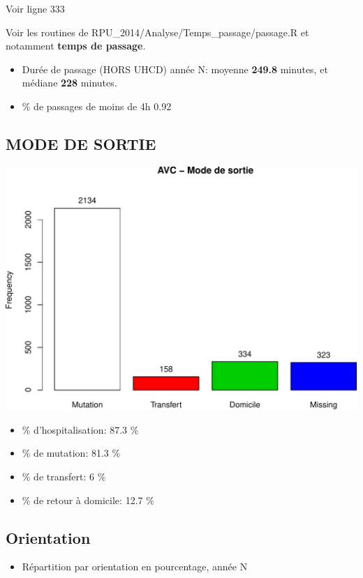 \documentclass[]{article}
\begin{document}
Voir ligne 333

Voir les routines de RPU\_2014/Analyse/Temps\_passage/passage.R et
notamment \textbf{temps de passage}.

\begin{itemize}
\itemsep1pt\parskip0pt
\item
  Durée de passage (HORS UHCD) année N: moyenne \textbf{249.8} minutes,
  et médiane \textbf{228} minutes.
\item
  \% de passages de moins de 4h 0.92
\end{itemize}

\subsection{MODE DE SORTIE}\label{mode-de-sortie-2}

\includegraphics{rapport2014_V4_files/figure-latex/avc_mode_sortie-1.pdf}

\begin{itemize}
\itemsep1pt\parskip0pt
\item
  \% d'hospitalisation: 87.3 \%
\item
  \% de mutation: 81.3 \%
\item
  \% de transfert: 6 \%
\item
  \% de retour à domicile: 12.7 \%
\end{itemize}

\subsection{Orientation}\label{orientation}

\begin{itemize}
\itemsep1pt\parskip0pt
\item
  Répartition par orientation en pourcentage, année N
\end{itemize}
\end{document}
